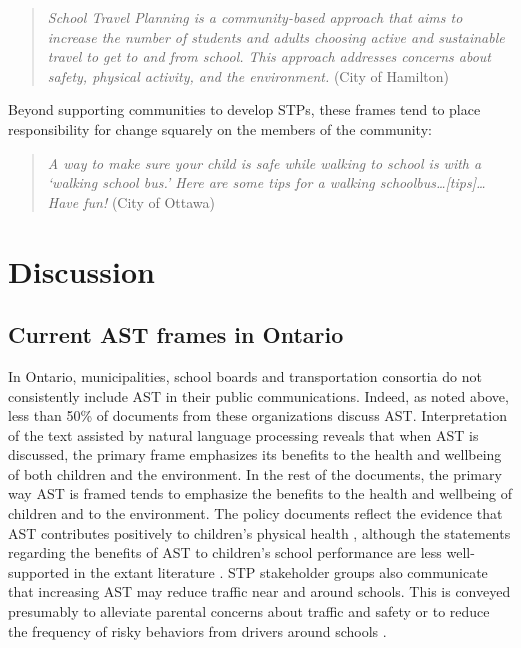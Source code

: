 \documentclass[preprint, 3p,
authoryear]{elsarticle} %
\begin{document}
\begin{quote}
\emph{School Travel Planning is a community-based approach that aims to
increase the number of students and adults choosing active and
sustainable travel to get to and from school. This approach addresses
concerns about safety, physical activity, and the environment.} (City of
Hamilton)
\end{quote}

Beyond supporting communities to develop STPs, these frames tend to
place responsibility for change squarely on the members of the
community:

\begin{quote}
\emph{A way to make sure your child is safe while walking to school is
with a `walking school bus.' Here are some tips for a walking
schoolbus\ldots{[}tips{]}\ldots Have fun!} (City of Ottawa)
\end{quote}

\hypertarget{discussion}{%
\section{Discussion}\label{discussion}}

\hypertarget{current-ast-frames-in-ontario}{%
\subsection{Current AST frames in
Ontario}\label{current-ast-frames-in-ontario}}

In Ontario, municipalities, school boards and transportation consortia
do not consistently include AST in their public communications. Indeed,
as noted above, less than 50\% of documents from these organizations
discuss AST. Interpretation of the text assisted by natural language
processing reveals that when AST is discussed, the primary frame
emphasizes its benefits to the health and wellbeing of both children and
the environment. In the rest of the documents, the primary way AST is
framed tends to emphasize the benefits to the health and wellbeing of
children and to the environment. The policy documents reflect the
evidence that AST contributes positively to children's physical health
\citep[see][]{faulknerActiveSchoolTransport2009, schoeppeAssociationsChildrenActive2015},
although the statements regarding the benefits of AST to children's
school performance are less well-supported in the extant literature
\citep{westmanTravelChildWellbeing2020}. STP stakeholder groups also
communicate that increasing AST may reduce traffic near and around
schools. This is conveyed presumably to alleviate parental concerns
about traffic and safety
\citep{eversParentSafetyPerceptions2014, mammenUnderstandingDriveEscort2012, rothmanAssociationsParentsPerception2015, wilsonUnderstandingChildParent2018}
or to reduce the frequency of risky behaviors from drivers around
schools \citep{rothmanSchoolEnvironmentStudent2017}.
\end{document}
